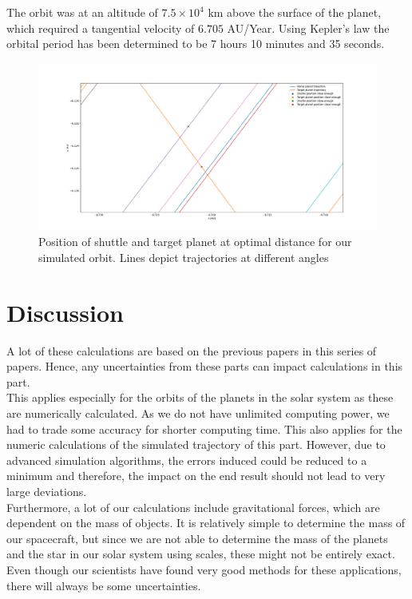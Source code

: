 \documentclass[reprint,english,notitlepage]{revtex4-2}
\begin{document}
    The orbit was at an altitude of $7.5 \times 10^4$ km above the surface of the planet, which required a tangential velocity of $6.705$ AU/Year.
    Using Kepler's law the orbital period has been determined to be 7 hours 10 minutes and 35 seconds.

    \begin{figure}[h]
      \centering
      \includegraphics[scale = .125]{Figures/good_enough_distance}
      \caption{Position of shuttle and target planet at optimal distance for our simulated orbit. Lines depict trajectories at different angles}
      \label{fig: good enough distance}
    \end{figure}


\section{Discussion} \label{sec: discussion}
A lot of these calculations are based on the previous papers in this series of papers.
Hence, any uncertainties from these parts can impact calculations in this part.\\
This applies especially for the orbits of the planets in the solar system as these are numerically calculated.
As we do not have unlimited computing power, we had to trade some accuracy for shorter computing time.
This also applies for the numeric calculations of the simulated trajectory of this part.
However, due to advanced simulation algorithms, the errors induced could be reduced to a minimum and therefore, the impact on the end result should not lead to very large deviations.\\
Furthermore, a lot of our calculations include gravitational forces, which are dependent on the mass of objects.
It is relatively simple to determine the mass of our spacecraft, but since we are not able to determine the mass of the planets and the star in our solar system using scales, these might not be entirely exact.
Even though our scientists have found very good methods for these applications, there will always be some uncertainties.
\end{document}

